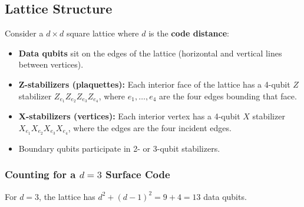\documentclass[11pt, a4paper]{article}
\theoremstyle{definition}
\theoremstyle{plain}
\theoremstyle{remark}
\begin{document}
\subsection{Lattice Structure}

Consider a $d \times d$ square lattice where $d$ is the \textbf{code distance}:

\begin{itemize}
  \item \textbf{Data qubits} sit on the edges of the lattice (horizontal
        and vertical lines between vertices).
  \item \textbf{Z-stabilizers (plaquettes):} Each interior face of the lattice
        has a 4-qubit $Z$ stabilizer $Z_{e_1}Z_{e_2}Z_{e_3}Z_{e_4}$, where
        $e_1, \ldots, e_4$ are the four edges bounding that face.
  \item \textbf{X-stabilizers (vertices):} Each interior vertex has a 4-qubit
        $X$ stabilizer $X_{e_1}X_{e_2}X_{e_3}X_{e_4}$, where the edges are
        the four incident edges.
  \item Boundary qubits participate in 2- or 3-qubit stabilizers.
\end{itemize}

\subsubsection{Counting for a $d=3$ Surface Code}

For $d = 3$, the lattice has $d^2 + (d-1)^2 = 9 + 4 = 13$ data qubits.
\end{document}
